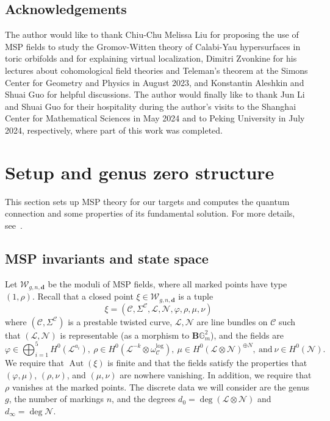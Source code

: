 \documentclass[10pt]{amsart}
\theoremstyle{definition}
\theoremstyle{remark}
\theoremstyle{plain}
\theoremstyle{definition}
\theoremstyle{remark}
\newcommand{\G}{\mathbb{G}}
\newcommand{\msc}[1]{\mathscr{#1}}
\newcommand{\mbf}[1]{\mathbf{#1}}
\newcommand{\1}{\mathbf{1}}
\newcommand{\2}{\mathbf{2}}
\newcommand{\3}{\mathbf{3}}
\DeclareMathOperator{\Aut}{Aut}
\numberwithin{equation}{section}
\begin{document}
\subsection*{Acknowledgements}%
\label{sub:Acknowledgements}

The author would like to thank Chiu-Chu Melissa Liu for proposing the use of MSP fields to study the Gromov-Witten theory of Calabi-Yau hypersurfaces in toric orbifolds and for explaining virtual localization, Dimitri Zvonkine for his lectures about cohomological field theories and Teleman's theorem at the Simons Center for Geometry and Physics in August 2023, and Konstantin Aleshkin and Shuai Guo for helpful discussions. The author would finally like to thank Jun Li and Shuai Guo for their hospitality during the author's visits to the Shanghai Center for Mathematical Sciences in May 2024 and to Peking University in July 2024, respectively, where part of this work was completed.


\section{Setup and genus zero structure}%
\label{sec:Setup and genus zero structure}

This section sets up MSP theory for our targets and computes the quantum connection and some properties of its fundamental solution. For more details, see~\cite{foundations}.

\subsection{MSP invariants and state space}%
\label{sub:invariants and state space}


Let $\msc{W}_{g,n,\mbf{d}}$ be the moduli of MSP fields, where all marked points have type $(1,\rho)$. Recall that a closed point $\xi \in \msc{W}_{g,n,\mbf{d}}$ is a tuple
\[ \xi = (\msc{C}, \Sigma^{\msc{C}}, \msc{L}, \msc{N}, \varphi , \rho , \mu , \nu ) \]
where $(\msc{C}, \Sigma^{\msc{C}})$ is a prestable twisted curve, $\msc{L}, \msc{N}$ are line bundles on $\msc{C}$ such that $(\msc{L}, \msc{N})$ is representable (as a morphism to $\mbf{B}\G_m^2$), and the fields are
\[ \varphi \in \bigoplus_{i=1}^5 H^0(\msc{L}^{a_i}),\ \rho \in H^0(\msc{L}^{-k} \otimes \omega_{\msc{C}}^{\log}),\ \mu \in H^0(\msc{L} \otimes \msc{N})^{\oplus N},\ \text{and}\ \nu \in H^0(\msc{N}). \]
We require that $\Aut(\xi)$ is finite and that the fields satisfy the properties that $(\varphi, \mu)$, $(\rho, \nu)$, and $(\mu, \nu)$ are nowhere vanishing. In addition, we require that $\rho$ vanishes at the marked points. The discrete data we will consider are the genus $g$, the number of markings $n$, and the degrees $d_0 = \deg (\msc{L} \otimes \msc{N})$ and $d_{\infty} = \deg \msc{N}$. 
\end{document}
